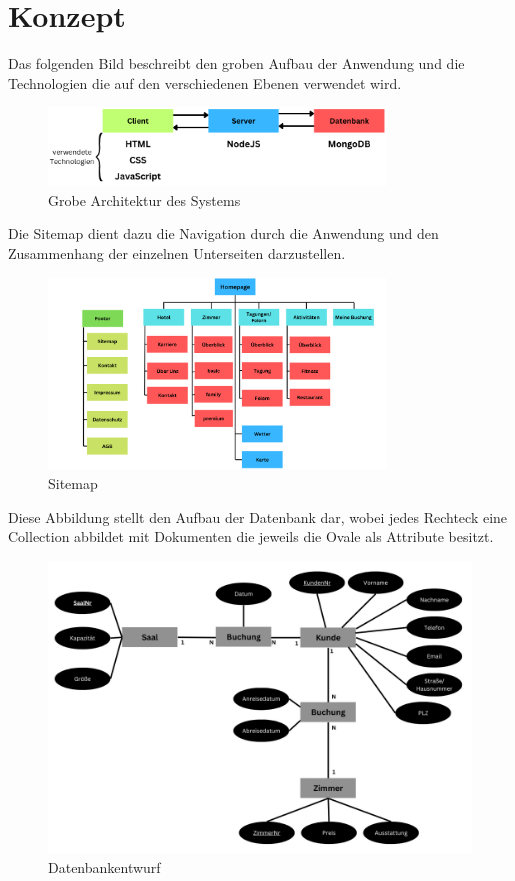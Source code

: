 \chapter{Konzept}
Das folgenden Bild beschreibt den groben Aufbau der Anwendung und die Technologien die auf den verschiedenen Ebenen verwendet wird.
\begin{figure}
	\includegraphics[width=0.8\textwidth]{images/Architektur.png}
	\centering
	\caption{Grobe Architektur des Systems}
\end{figure}

Die Sitemap dient dazu die Navigation durch die  Anwendung und den Zusammenhang der einzelnen Unterseiten darzustellen.
\begin{figure}
	\includegraphics[width=0.8\textwidth]{images/Sitemap.png}
	\centering
	\caption{Sitemap}
\end{figure}
\newpage
Diese Abbildung stellt den Aufbau der Datenbank dar, wobei jedes Rechteck eine Collection abbildet mit Dokumenten die jeweils die Ovale als Attribute besitzt.

\begin{figure}
	\includegraphics[width=\textwidth]{images/Datenbank.png}
	\caption{Datenbankentwurf}
\end{figure}

